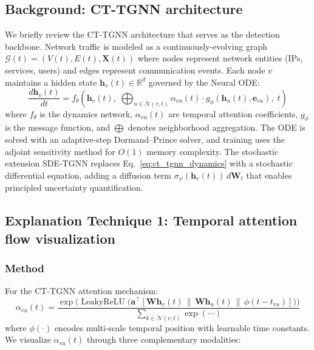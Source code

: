 \documentclass[preprint,review,12pt]{elsarticle}
\newcommand{\R}{\mathbb{R}}
\newcommand{\calG}{\mathcal{G}}
\newcommand{\calN}{\mathcal{N}}
\DeclareMathOperator{\LeakyReLU}{LeakyReLU}
\begin{document}
\subsection{Background: CT-TGNN architecture}

We briefly review the CT-TGNN architecture \cite{anaedevha_ct_tgnn} that serves as the detection backbone. Network traffic is modeled as a continuously-evolving graph $\calG(t) = (V(t), E(t), \mathbf{X}(t))$ where nodes represent network entities (IPs, services, users) and edges represent communication events. Each node $v$ maintains a hidden state $\mathbf{h}_v(t) \in \R^d$ governed by the Neural ODE:
\begin{equation}\label{eq:ct_tgnn_dynamics}
    \frac{d\mathbf{h}_v(t)}{dt} = f_\theta\!\left(\mathbf{h}_v(t),\; \bigoplus_{u \in \calN(v,t)} \alpha_{vu}(t) \cdot g_\phi(\mathbf{h}_u(t), \mathbf{e}_{vu}),\; t\right)
\end{equation}
where $f_\theta$ is the dynamics network, $\alpha_{vu}(t)$ are temporal attention coefficients, $g_\phi$ is the message function, and $\bigoplus$ denotes neighborhood aggregation. The ODE is solved with an adaptive-step Dormand--Prince solver, and training uses the adjoint sensitivity method for $O(1)$ memory complexity. The stochastic extension SDE-TGNN replaces Eq.~\eqref{eq:ct_tgnn_dynamics} with a stochastic differential equation, adding a diffusion term $\sigma_\psi(\mathbf{h}_v(t)) \, d\mathbf{W}_t$ that enables principled uncertainty quantification.

\subsection{Explanation Technique 1: Temporal attention flow visualization}

\subsubsection{Method}
For the CT-TGNN attention mechanism:
\begin{equation}\label{eq:attention}
    \alpha_{vu}(t) = \frac{\exp\!\Big(\LeakyReLU\!\big(\mathbf{a}^\top[\mathbf{W}\mathbf{h}_v(t) \,\|\, \mathbf{W}\mathbf{h}_u(t) \,\|\, \phi(t{-}t_{vu})]\big)\Big)}{\sum_{k \in \calN(v,t)} \exp(\cdots)}
\end{equation}
where $\phi(\cdot)$ encodes multi-scale temporal position with learnable time constants. We visualize $\alpha_{vu}(t)$ through three complementary modalities:
\end{document}
